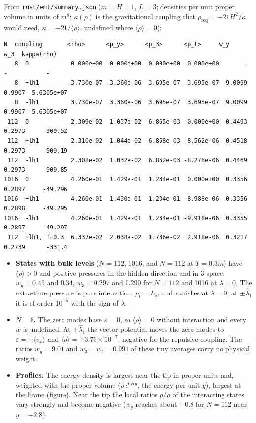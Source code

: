 \documentclass[11pt]{article}
\begin{document}
From \texttt{rust/emt\allowbreak{}/summary\allowbreak{}.json} ($m=H=1$, $L=3$; densities per unit proper volume in units of $m^8$; $\kappa(\rho)$ is the gravitational coupling that $\rho_{\mathrm{req}}=-21H^2/\kappa$ would need, $\kappa=-21/\langle\rho\rangle$, undefined where $\langle\rho\rangle=0$):

\begin{Verbatim}[fontsize=\small]
   N  coupling       <rho>      <p_y>      <p_3>      <p_t>     w_y     w_3  kappa(rho)
   8  0            0.000e+00  0.000e+00  0.000e+00  0.000e+00       -       -           -
   8  +lh1        -3.730e-07 -3.360e-06 -3.695e-07 -3.695e-07  9.0099  0.9907  5.6305e+07
   8  -lh1         3.730e-07  3.360e-06  3.695e-07  3.695e-07  9.0099  0.9907 -5.6305e+07
 112  0            2.309e-02  1.037e-02  6.865e-03  0.000e+00  0.4493  0.2973     -909.52
 112  +lh1         2.310e-02  1.044e-02  6.868e-03  8.562e-06  0.4518  0.2973     -909.19
 112  -lh1         2.308e-02  1.032e-02  6.862e-03 -8.278e-06  0.4469  0.2973     -909.85
1016  0            4.260e-01  1.429e-01  1.234e-01  0.000e+00  0.3356  0.2897     -49.296
1016  +lh1         4.260e-01  1.430e-01  1.234e-01  8.988e-06  0.3356  0.2898     -49.295
1016  -lh1         4.260e-01  1.429e-01  1.234e-01 -9.918e-06  0.3355  0.2897     -49.297
 112  +lh1, T=0.3  6.337e-02  2.038e-02  1.736e-02  2.918e-06  0.3217  0.2739      -331.4
\end{Verbatim}

\begin{itemize}
\item \textbf{States with bulk levels} ($N=112$, 1016, and $N=112$ at $T=0.3m$) have $\langle\rho\rangle>0$ and positive pressures in the hidden direction and in 3-space: $w_y=0.45$ and $0.34$, $w_3=0.297$ and $0.290$ for $N=112$ and 1016 at $\lambda=0$. The extra-time pressure is pure interaction, $p_t=L_s$, and vanishes at $\lambda=0$; at $\pm\hat\lambda_1$ it is of order $10^{-5}$ with the sign of $\lambda$.
\item \textbf{$N=8$.} The zero modes have $\varepsilon=0$, so $\langle\rho\rangle=0$ without interaction and every $w$ is undefined. At $\pm\hat\lambda_1$ the vector potential moves the zero modes to $\varepsilon=\pm\langle v_x\rangle$ and $\langle\rho\rangle=\mp3.73\times10^{-7}$: negative for the repulsive coupling. The ratios $w_y=9.01$ and $w_3=w_t=0.991$ of these tiny averages carry no physical weight.
\item \textbf{Profiles.} The energy density is largest near the tip in proper units and, weighted with the proper volume ($\rho\,e^{6Hy}$, the energy per unit $y$), largest at the brane (figure). Near the tip the local ratios $p/\rho$ of the interacting states vary strongly and become negative ($w_y$ reaches about $-0.8$ for $N=112$ near $y=-2.8$).
\end{itemize}
\end{document}
